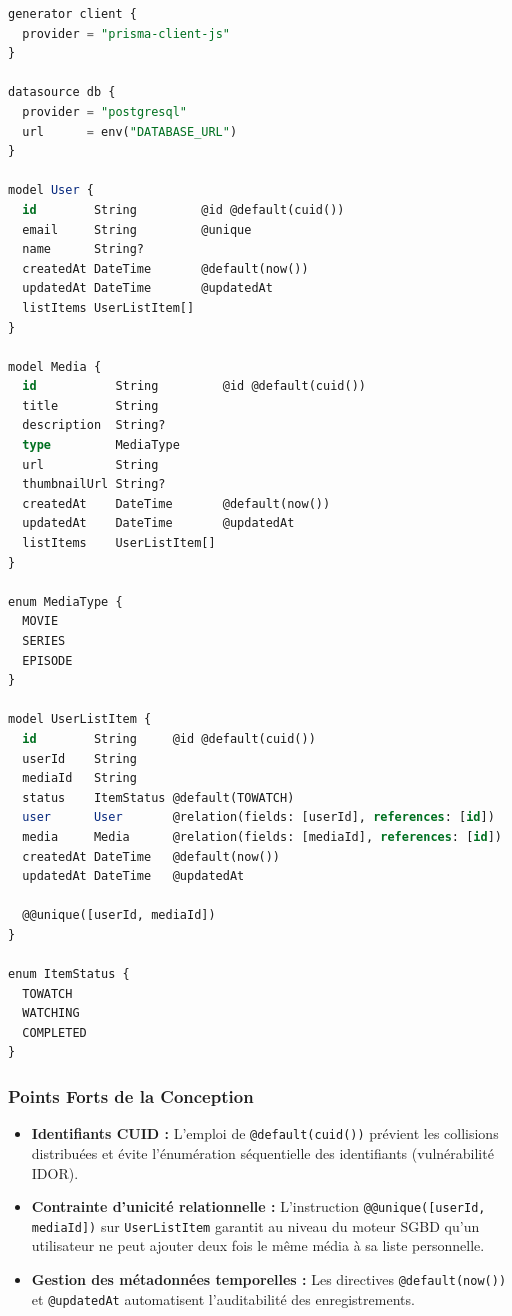 \documentclass[11pt,a4paper]{article}
\begin{document}
\begin{lstlisting}[language=SQL, caption={Définition du modèle relationnel dans schema.prisma}]
generator client {
  provider = "prisma-client-js"
}

datasource db {
  provider = "postgresql"
  url      = env("DATABASE_URL")
}

model User {
  id        String         @id @default(cuid())
  email     String         @unique
  name      String?
  createdAt DateTime       @default(now())
  updatedAt DateTime       @updatedAt
  listItems UserListItem[]
}

model Media {
  id           String         @id @default(cuid())
  title        String
  description  String?
  type         MediaType
  url          String
  thumbnailUrl String?
  createdAt    DateTime       @default(now())
  updatedAt    DateTime       @updatedAt
  listItems    UserListItem[]
}

enum MediaType {
  MOVIE
  SERIES
  EPISODE
}

model UserListItem {
  id        String     @id @default(cuid())
  userId    String
  mediaId   String
  status    ItemStatus @default(TOWATCH)
  user      User       @relation(fields: [userId], references: [id])
  media     Media      @relation(fields: [mediaId], references: [id])
  createdAt DateTime   @default(now())
  updatedAt DateTime   @updatedAt

  @@unique([userId, mediaId])
}

enum ItemStatus {
  TOWATCH
  WATCHING
  COMPLETED
}
\end{lstlisting}

\subsubsection{Points Forts de la Conception}
\begin{itemize}
    \item \textbf{Identifiants CUID :} L'emploi de \texttt{@default(cuid())} prévient les collisions distribuées et évite l'énumération séquentielle des identifiants (vulnérabilité IDOR).
    \item \textbf{Contrainte d'unicité relationnelle :} L'instruction \texttt{@@unique([userId, mediaId])} sur \texttt{UserListItem} garantit au niveau du moteur SGBD qu'un utilisateur ne peut ajouter deux fois le même média à sa liste personnelle.
    \item \textbf{Gestion des métadonnées temporelles :} Les directives \texttt{@default(now())} et \texttt{@updatedAt} automatisent l'auditabilité des enregistrements.
\end{itemize}
\end{document}
